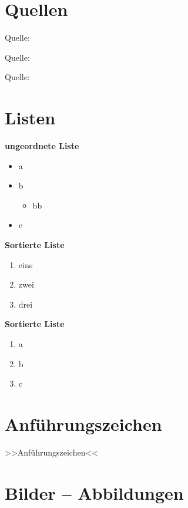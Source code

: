 \section{Quellen}\label{quellen}

Quelle: ~\textcite{monk:2016:action}

Quelle: ~\textcite{homofaciens:2018:projekt}

Quelle: ~\textcite{kofler:2018:hacking}

\section{Listen}\label{listen}

\textbf{ungeordnete Liste}

\begin{itemize}
\item
  a
\item
  b

  \begin{itemize}
  \item
    bb
  \end{itemize}
\item
  c
\end{itemize}

\textbf{Sortierte Liste}

\begin{enumerate}
\item
  eins
\item
  zwei
\item
  drei
\end{enumerate}

\textbf{Sortierte Liste}

\begin{enumerate}
\def\labelenumi{\alph{enumi})}
\item
  a
\item
  b
\item
  c
\end{enumerate}

\section{Anführungszeichen}\label{anfuehrungszeichen}

>>Anführungszeichen<<

\section{Bilder -- Abbildungen}\label{bilder-abbildungen}

